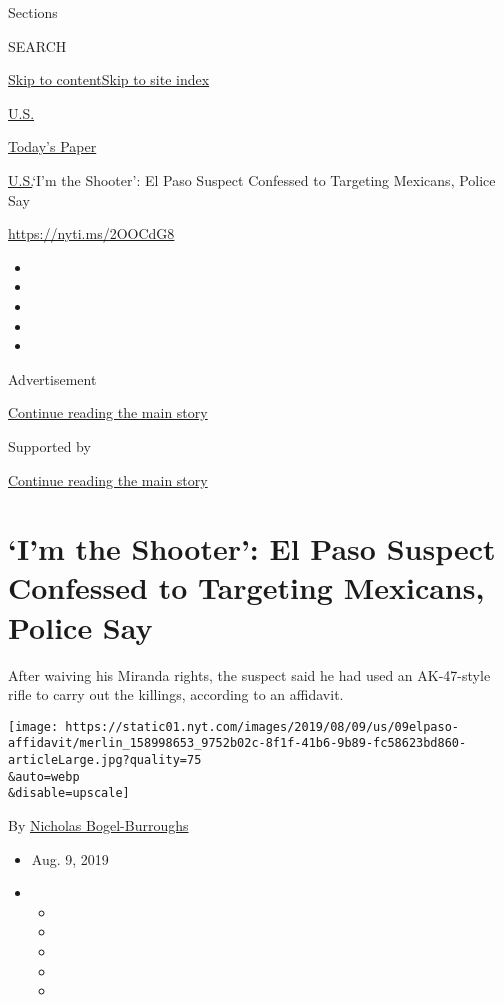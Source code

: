 Sections

SEARCH

\protect\hyperlink{site-content}{Skip to
content}\protect\hyperlink{site-index}{Skip to site index}

\href{https://www.nytimes.com/section/us}{U.S.}

\href{https://myaccount.nytimes.com/auth/login?response_type=cookie\&client_id=vi}{}

\href{https://www.nytimes.com/section/todayspaper}{Today's Paper}

\href{/section/us}{U.S.}\textbar{}`I'm the Shooter': El Paso Suspect
Confessed to Targeting Mexicans, Police Say

\url{https://nyti.ms/2OOCdG8}

\begin{itemize}
\item
\item
\item
\item
\item
\end{itemize}

Advertisement

\protect\hyperlink{after-top}{Continue reading the main story}

Supported by

\protect\hyperlink{after-sponsor}{Continue reading the main story}

\hypertarget{im-the-shooter-el-paso-suspect-confessed-to-targeting-mexicans-police-say}{%
\section{`I'm the Shooter': El Paso Suspect Confessed to Targeting
Mexicans, Police
Say}\label{im-the-shooter-el-paso-suspect-confessed-to-targeting-mexicans-police-say}}

After waiving his Miranda rights, the suspect said he had used an
AK-47-style rifle to carry out the killings, according to an affidavit.

\texttt{[image: https://static01.nyt.com/images/2019/08/09/us/09elpaso-affidavit/merlin\_158998653\_9752b02c-8f1f-41b6-9b89-fc58623bd860-articleLarge.jpg?quality=75\\\&auto=webp\\\&disable=upscale]}

By \href{https://www.nytimes.com/by/nicholas-bogel-burroughs}{Nicholas
Bogel-Burroughs}

\begin{itemize}
\item
  Aug. 9, 2019
\item
  \begin{itemize}
  \item
  \item
  \item
  \item
  \item
  \end{itemize}
\end{itemize}

